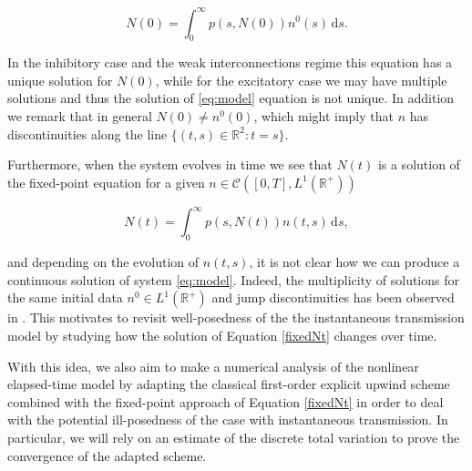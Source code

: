 \documentclass[11pt,a4paper]{article}
\newcommand{\R}{\mathbb{R}}
\newcommand{\dd}{\mathrm{d}}
\begin{document}
\begin{equation}
\label{eqN0}
    N(0)=\int_0^\infty p(s,N(0))n^0(s)\,\dd s.
\end{equation}

In the inhibitory case and the weak interconnections regime this equation has a unique solution for $N(0)$, while for the excitatory case we may have multiple solutions and thus the solution of \eqref{eq:model} equation is not unique. In addition we remark that in general $N(0)\neq n^0(0)$, which might imply that $n$ has discontinuities along the line $\{(t,s)\in\R^2\colon t=s\}$. 

Furthermore, when the system evolves in time we see that $N(t)$ is a solution of the fixed-point equation for a given $n\in\mathcal{C}([0,T],L^1(\R^+))$

\begin{equation}
\label{fixedNt}
    N(t)=\int_0^\infty p(s,N(t))n(t,s)\,\dd s,
\end{equation}

and depending on the evolution of $n(t,s)$, it is not clear how we can produce a continuous solution of system \eqref{eq:model}. Indeed, the multiplicity of solutions for the same initial data $n^0\in L^1(\R^+)$ and jump discontinuities has been observed in \cite{torres2021elapsed}.
This motivates to revisit well-posedness of the the instantaneous transmission model by studying how the solution of Equation \eqref{fixedNt} changes over time. 

With this idea, we also aim to make a numerical analysis of the nonlinear elapsed-time model by adapting the classical first-order explicit upwind scheme combined with the fixed-point approach of Equation \eqref{fixedNt} in order to deal with the potential ill-posedness of the case with instantaneous transmission. In particular, we will rely on an estimate of the discrete total variation to prove the convergence of the adapted scheme.
\end{document}
